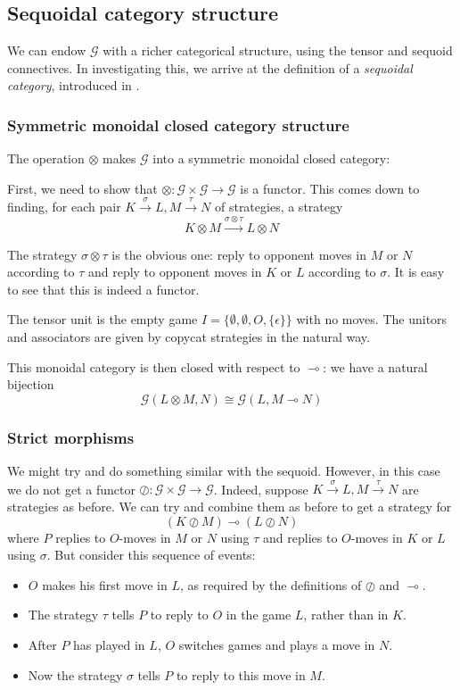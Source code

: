 \documentclass[11pt]{article} %
\theoremstyle{plain} %
\theoremstyle{definition} %
\theoremstyle{exercisestyle}
\newcommand{\map}[3]{#2\xrightarrow{#1} #3}
\newcommand*\from{\colon}
\newcommand{\cmap}[3]{#1\from{}#2\to{}#3}
\newcommand{\tensor}{\otimes}
\newcommand{\sequoid}{\oslash}
\renewcommand{\implies}{\multimap}
\newcommand{\G}{\mathcal G}
\begin{document}
\subsection{Sequoidal category structure}

We can endow $\mathcal G$ with a richer categorical structure, using the tensor and sequoid connectives.  In investigating this, we arrive at the definition of a \emph{sequoidal category}, introduced in \cite{laird02}.  

\subsubsection{Symmetric monoidal closed category structure}

The operation $\tensor$ makes $\mathcal G$ into a symmetric monoidal closed category:

First, we need to show that $\cmap{\tensor}{\G\times\G}{\G}$ is a functor.  This comes down to finding, for each pair $\map{\sigma}{K}{L},\map{\tau}{M}{N}$ of strategies, a strategy 
\[
  \map{\sigma\tensor\tau}{K\tensor M}{L\tensor N}
\]

The strategy $\sigma\tensor\tau$ is the obvious one: reply to opponent moves in $M$ or $N$ according to $\tau$ and reply to opponent moves in $K$ or $L$ according to $\sigma$.  It is easy to see that this is indeed a functor.

The tensor unit is the empty game $I=\{\emptyset,\emptyset,O,\{\epsilon\}\}$ with no moves.  The unitors and associators are given by copycat strategies in the natural way.

This monoidal category is then closed with respect to $\implies$: we have a natural bijection
\[
  \G(L\tensor M,N)\cong\G(L,M\implies N)
\]

\subsubsection{Strict morphisms}

We might try and do something similar with the sequoid.  However, in this case we do not get a functor $\cmap{\sequoid}{\G\times\G}{\G}$.  Indeed, suppose $\map{\sigma}{K}{L},\map{\tau}{M}{N}$ are strategies as before.  We can try and combine them as before to get a strategy for
\[
  (K\sequoid M) \implies (L\sequoid N)
\]
where $P$ replies to $O$-moves in $M$ or $N$ using $\tau$ and replies to $O$-moves in $K$ or $L$ using $\sigma$.  But consider this sequence of events:
\begin{itemize}
  \item $O$ makes his first move in $L$, as required by the definitions of $\sequoid$ and $\implies$.
  \item The strategy $\tau$ tells $P$ to reply to $O$ in the game $L$, rather than in $K$.
  \item After $P$ has played in $L$, $O$ switches games and plays a move in $N$.  
  \item Now the strategy $\sigma$ tells $P$ to reply to this move in $M$.
\end{itemize}
\end{document}
